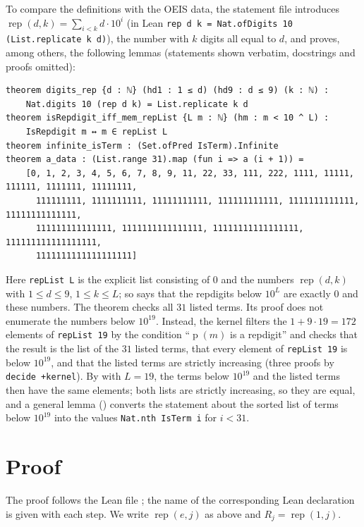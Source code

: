 \documentclass[11pt]{amsart}
\theoremstyle{plain}
\theoremstyle{definition}
\newcommand{\rep}{\operatorname{rep}}
\newcommand{\dprod}{\operatorname{p}}
\begin{document}
To compare the definitions with the OEIS data, the statement file introduces $\rep(d,k)=\sum_{i<k}d\cdot10^i$ (in Lean \texttt{rep d k = Nat.ofDigits 10 (List.replicate k d)}), the number with $k$ digits all equal to $d$, and proves, among others, the following lemmas (statements shown verbatim, docstrings and proofs omitted):
\begin{lstlisting}
theorem digits_rep {d : ℕ} (hd1 : 1 ≤ d) (hd9 : d ≤ 9) (k : ℕ) :
    Nat.digits 10 (rep d k) = List.replicate k d
theorem isRepdigit_iff_mem_repList {L m : ℕ} (hm : m < 10 ^ L) :
    IsRepdigit m ↔ m ∈ repList L
theorem infinite_isTerm : (Set.ofPred IsTerm).Infinite
theorem a_data : (List.range 31).map (fun i => a (i + 1)) =
    [0, 1, 2, 3, 4, 5, 6, 7, 8, 9, 11, 22, 33, 111, 222, 1111, 11111, 111111, 1111111, 11111111,
      111111111, 1111111111, 11111111111, 111111111111, 1111111111111, 11111111111111,
      111111111111111, 1111111111111111, 11111111111111111, 111111111111111111,
      1111111111111111111]
\end{lstlisting}
Here \texttt{repList L} is the explicit list consisting of $0$ and the numbers $\rep(d,k)$ with $1\le d\le9$, $1\le k\le L$; so  says that the repdigits below $10^L$ are exactly $0$ and these numbers.
The theorem  checks all $31$ listed terms. Its proof does not enumerate the numbers below $10^{19}$. Instead, the kernel filters the $1+9\cdot19=172$ elements of \texttt{repList 19} by the condition ``$\dprod(m)$ is a repdigit'' and checks that the result is the list of the $31$ listed terms, that every element of \texttt{repList 19} is below $10^{19}$, and that the listed terms are strictly increasing (three proofs by \texttt{decide +kernel}). By  with $L=19$, the terms below $10^{19}$ and the listed terms then have the same elements; both lists are strictly increasing, so they are equal, and a general lemma () converts the statement about the sorted list of terms below $10^{19}$ into the values \texttt{Nat.nth IsTerm i} for $i<31$.

\section{Proof}\label{sec:proof}

The proof follows the Lean file ; the name of the corresponding Lean declaration is given with each step. We write $\rep(e,j)$ as above and $R_j=\rep(1,j)$.
\end{document}
